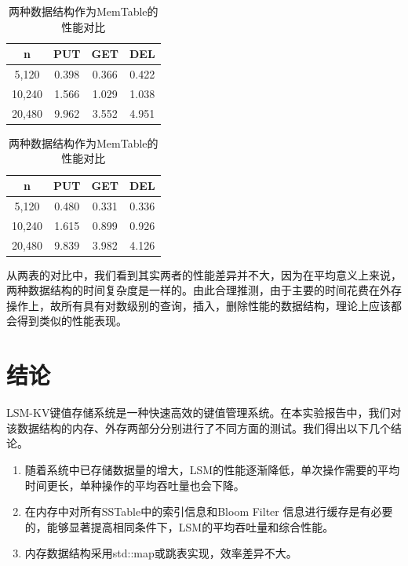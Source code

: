 \documentclass{article}
\begin{document}
\begin{table}[ht]
	\caption{两种数据结构作为MemTable的性能对比}
	\label{tab:4}
	\begin{minipage}{0.5\textwidth}
		\begin{center}
			\begin{tabular}{c | c | c | c}
				\hline
				n & PUT & GET & DEL \\
				\hline\hline
				5,120 & 0.398 & 0.366 & 0.422 \\
				10,240 & 1.566 & 1.029 & 1.038 \\
				20,480 & 9.962 & 3.552 & 4.951 \\
				\hline
			\end{tabular}
		\end{center}
	\end{minipage}
	\begin{minipage}{0.5\textwidth}
		\begin{center}
			\begin{tabular}{c | c | c | c}
				\hline
				n & PUT & GET & DEL \\
				\hline\hline
				5,120 & 0.480 & 0.331 & 0.336 \\
				10,240 & 1.615 & 0.899 & 0.926 \\
				20,480 & 9.839 & 3.982 & 4.126 \\
				\hline
			\end{tabular}
		\end{center}
	\end{minipage}
\end{table}

从两表的对比中，我们看到其实两者的性能差异并不大，因为在平均意义上来说，两种数据结构的时间复杂度是一样的。由此合理推测，由于主要的时间花费在外存操作上，故所有具有对数级别的查询，插入，删除性能的数据结构，理论上应该都会得到类似的性能表现。

\section{结论}
LSM-KV键值存储系统是一种快速高效的键值管理系统。在本实验报告中，我们对该数据结构的内存、外存两部分分别进行了不同方面的测试。我们得出以下几个结论。

\begin{enumerate}
	\item 随着系统中已存储数据量的增大，LSM的性能逐渐降低，单次操作需要的平均时间更长，单种操作的平均吞吐量也会下降。
	\item 在内存中对所有SSTable中的索引信息和Bloom Filter 信息进行缓存是有必要的，能够显著提高相同条件下，LSM的平均吞吐量和综合性能。
	\item 内存数据结构采用std::map或跳表实现，效率差异不大。
\end{enumerate}
\end{document}
